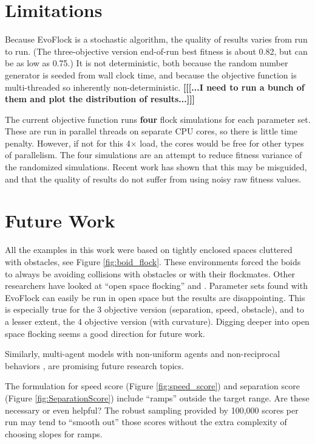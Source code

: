 \documentclass[letterpaper]{article}
\begin{document}
\section{Limitations}
\label{sec:limitations}

Because EvoFlock is a stochastic algorithm, the quality of results varies from run to run. (The three-objective version end-of-run best fitness is about 0.82, but can be as low as 0.75.) It is not deterministic, both because the random number generator is seeded from wall clock time, and because the objective function is multi-threaded so inherently non-deterministic.  \textbf{[[[...I need to run a bunch of them and plot the distribution of results...]]]}

The current objective function runs \textbf{four} flock simulations for each parameter set. These are run in parallel threads on separate CPU cores, so there is little time penalty. However, if not for this 4{$\times$} load, the cores would be free for other types of parallelism. The four simulations are an attempt to reduce fitness variance of the randomized simulations. Recent work \citep{antipov_evolutionary_2025} has shown that this may be misguided, and that the quality of results do not suffer from using noisy raw fitness values.

\section{Future Work}
\label{sec:future}

All the examples in this work were based on tightly enclosed spaces cluttered with obstacles, see Figure \ref{fig:boid_flock}. These environments forced the boids to always be avoiding collisions with obstacles or with their flockmates. Other researchers have looked at ``open space flocking'' \citep{hoetzlein_flock2_2024} and \citep{brambati_learning_2025}. Parameter sets found with EvoFlock can easily be run in open space but the results are disappointing. This is especially true for the 3 objective version (separation, speed, obstacle), and to a lesser extent, the 4 objective version (with curvature). Digging deeper into open space flocking seems a good direction for future work.

Similarly, multi-agent models with non-uniform agents \citep{montanari_optimal_2025} and non-reciprocal behaviors \citep{choi_flocking_2025}, \citep{weis_generalized_2025} are promising future research topics.

The formulation for speed score (Figure \ref{fig:speed_score}) and separation score (Figure \ref{fig:SeparationScore}) include ``ramps'' outside the target range. Are these necessary or even helpful? The robust sampling provided by 100,000 scores per run may tend to ``smooth out'' those scores without the extra complexity of choosing slopes for ramps.
\end{document}
